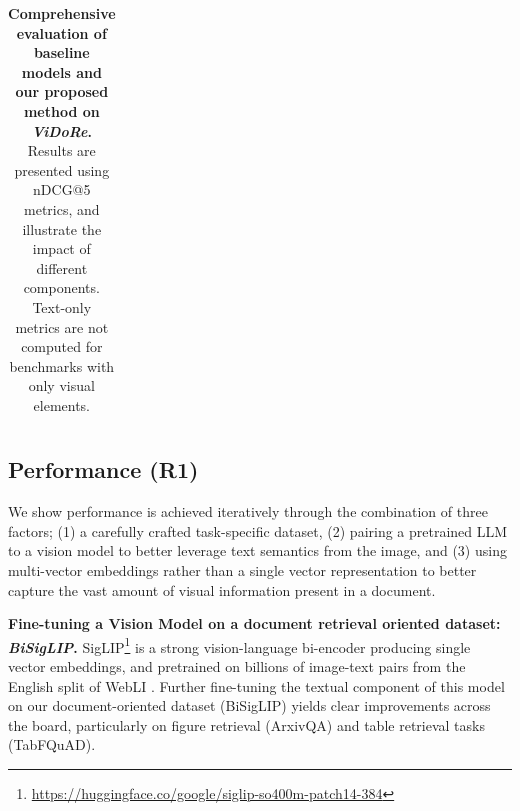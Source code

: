 \documentclass{article} %
\begin{document}
\begin{table}[ht]
{\begin{tabular}{ll@{\hskip 0.5em}l@{\hskip 0.5em}l@{\hskip 0.5em}l@{\hskip 0.5em}l@{\hskip 0.5em}l@{\hskip 0.5em}l@{\hskip 0.5em}l@{\hskip 0.5em}l@{\hskip 0.5em}l|@{\hskip 0.5em}l}
\bottomrule

\end{tabular}}


    \caption{\textbf{Comprehensive evaluation of baseline models and our proposed method on \textit{ViDoRe}.} Results are presented using nDCG@5 metrics, and illustrate the impact of different components. Text-only metrics are not computed for benchmarks with only visual elements.} 
    \label{table:results}
\end{table}



\subsection{Performance (R1)}
\label{subsection:performace}


We show performance is achieved iteratively through the combination of three factors; (1) a carefully crafted task-specific dataset, (2) pairing a pretrained LLM to a vision model to better leverage text semantics from the image, and (3) using multi-vector embeddings rather than a single vector representation to better capture the vast amount of visual information present in a document.
 
\noindent\textbf{Fine-tuning a Vision Model on a document retrieval oriented dataset: \textit{BiSigLIP}.} SigLIP\footnote{\url{https://huggingface.co/google/siglip-so400m-patch14-384}} is a strong vision-language bi-encoder producing single vector embeddings, and pretrained on billions of image-text pairs from the English split of WebLI \citep{chen_pali-3_2023}. Further fine-tuning the textual component of this model on our document-oriented dataset (BiSigLIP) yields clear improvements across the board, particularly on figure retrieval (ArxivQA) and table retrieval tasks (TabFQuAD).
\end{document}
